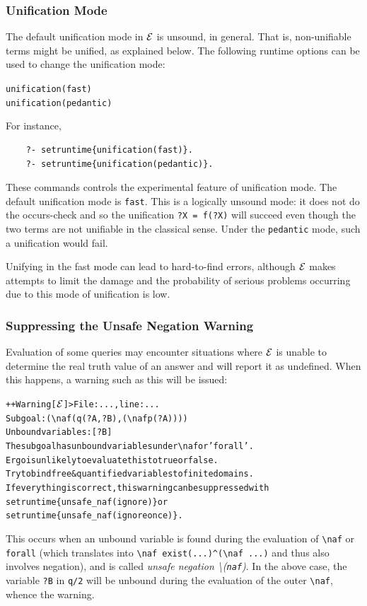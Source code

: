\documentclass[11pt]{article}
\newcommand{\ERGO}{\mbox{\ensuremath{\cal{E}}\smaller{{\sc{RGO}}}}\xspace}
\newcommand{\FLSYSTEM}{\ERGO}
\newcommand{\bs}{\textbackslash}
\begin{document}
\subsubsection{Unification Mode}

The default unification mode in \FLSYSTEM is
unsound, in general. That is, non-unifiable terms might be unified, as
explained below. The following runtime options can be used to change the
unification mode:
\begin{alltt}
    unification(fast)
    unification(pedantic)
\end{alltt}
For instance,
\begin{verbatim}
    ?- setruntime{unification(fast)}.
    ?- setruntime{unification(pedantic)}.
\end{verbatim}
These commands controls the experimental feature of unification mode.
The default unification mode is \texttt{fast}. This is a logically unsound
mode: it does not do the occurs-check and so the unification
\texttt{?X = f(?X)} will succeed even though the two terms are not
unifiable in the classical sense. Under the \texttt{pedantic} mode, such a
unification would fail.

Unifying in the fast mode can lead to hard-to-find errors, although \FLSYSTEM
makes attempts to limit the damage and the probability of serious problems
occurring due to this mode of unification is low.

\subsubsection{Suppressing the Unsafe Negation Warning}
\label{sec-unsafe-naf-suppress}

Evaluation of some queries may encounter situations where \FLSYSTEM is
unable to determine the real truth value of an answer and will report it as
undefined. When this happens, a warning such as this will be issued:
\begin{alltt}
  ++Warning[\FLSYSTEM]> File: ..., line: ...
		   Subgoal: (\bs{}naf (q(?A,?B), (\bs{}naf p(?A))))
		   Unbound variables: [?B]
		   The subgoal has unbound variables under \bs{}naf or 'forall'.
		   Ergo is unlikely to evaluate this to true or false.
		   Try to bind free & quantified variables to finite domains.
		   If everything is correct, this warning can be suppressed with
		      setruntime\{unsafe_naf(ignore)\} or
		      setruntime\{unsafe_naf(ignoreonce)\}.

\end{alltt}
\index{\bs{}naf!unsafe}
\index{unsafe \bs{}naf}
This occurs when an unbound variable is found during the evaluation of
\texttt{\bs{}naf} or \texttt{forall} (which translates into
\verb|\naf exist(...)^(\naf ...)| and thus also involves negation), and is
called \emph{unsafe negation \bs{}(\texttt{naf})}.    
In the above case, the variable \texttt{?B} in \texttt{q/2} will be unbound
during the evaluation of the outer \texttt{\bs{}naf}, whence the warning.   
\end{document}
